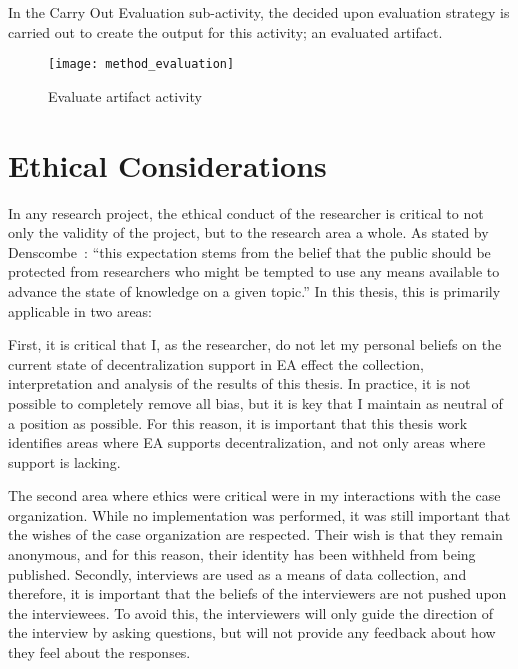 In the Carry Out Evaluation sub-activity, the decided upon evaluation strategy is carried out to create the output for this activity; an evaluated artifact. 

\begin{figure}
\texttt{[image: method\_evaluation]}
\caption{Evaluate artifact activity}
\label{fig:method_eval}
\end{figure}

\label{sec:ethics}
\section{Ethical Considerations}
%



In any research project, the ethical conduct of the researcher is critical to not only the validity of the project, but to the research area a whole. As stated by Denscombe~\cite{denscombe2010good}: ``this expectation stems from the belief that the public should be protected from researchers who might be tempted to use any means available to advance the state of knowledge on a given topic.'' In this thesis, this is primarily applicable in two areas:

First, it is critical that I, as the researcher, do not let my personal beliefs on the current state of decentralization support in EA effect the collection, interpretation and analysis of the results of this thesis. In practice, it is not possible to completely remove all bias, but it is key that I maintain as neutral of a position as possible. For this reason, it is important that this thesis work identifies areas where EA supports decentralization, and not only areas where support is lacking. 

The second area where ethics were critical were in my interactions with the case organization. While no implementation was performed, it was still important that the wishes of the case organization are respected. Their wish is that they remain anonymous, and for this reason, their identity has been withheld from being published. Secondly, interviews are used as a means of data collection, and therefore, it is important that the beliefs of the interviewers are not pushed upon the interviewees. To avoid this, the interviewers will only guide the direction of the interview by asking questions, but will not provide any feedback about how they feel about the responses. 

%
